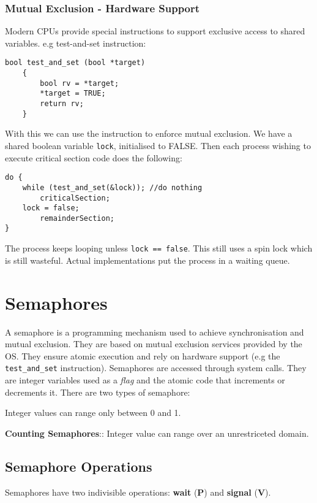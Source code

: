 \documentclass[11pt]{article}
\begin{document}
\subsubsection{Mutual Exclusion - Hardware Support}
\label{sec:org3cf128a}
Modern CPUs provide special instructions to support exclusive access to shared variables.
e.g test-and-set instruction:
\begin{verbatim}
bool test_and_set (bool *target)
    {
        bool rv = *target;
        *target = TRUE;
        return rv;
    }
\end{verbatim}

With this we can use the instruction to enforce mutual exclusion.
We have a shared boolean variable \texttt{lock}, initialised to FALSE.
Then each process wishing to execute critical section code does the following:
\begin{verbatim}
do {
    while (test_and_set(&lock)); //do nothing
        criticalSection;
    lock = false;
        remainderSection;
}
\end{verbatim}
The process keeps looping unless \texttt{lock == false}.
This still uses a spin lock which is still wasteful.
Actual implementations put the process in a waiting queue.

\section{Semaphores}
\label{sec:org8d48254}
A semaphore is a programming mechanism used to achieve synchronisation and mutual exclusion.
They are based on mutual exclusion services provided by the OS.
They ensure atomic execution and rely on hardware support (e.g the \texttt{test\_and\_set} instruction).
Semaphores are accessed through system calls.
They are integer variables used as a \emph{flag} and the atomic code that increments or decrements it.
There are two types of semaphore:
\begin{description}
\item[{\textbf{Binary Semaphores} (mutex)}] Integer values can range only between 0 and 1.
\item \textbf{Counting Semaphores}:: Integer value can range over an unrestriceted domain.
\end{description}

\subsection{Semaphore Operations}
\label{sec:org347484f}
Semaphores have two indivisible operations: \textbf{wait} (\textbf{P}) and \textbf{signal} (\textbf{V}).
\end{document}
